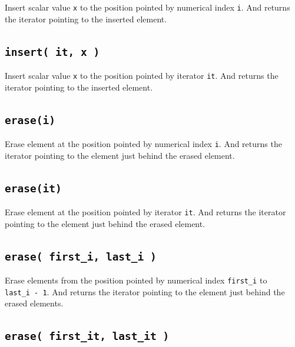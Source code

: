 \documentclass[
]{book}
\begin{document}
Insert scalar value \texttt{x} to the position pointed by numerical index \texttt{i}. And returns the iterator pointing to the inserted element.

\hypertarget{insert-it-x}{%
\subsection{\texorpdfstring{\texttt{insert(\ it,\ x\ )}}{insert( it, x )}}\label{insert-it-x}}

Insert scalar value \texttt{x} to the position pointed by iterator \texttt{it}. And returns the iterator pointing to the inserted element.

\hypertarget{erasei}{%
\subsection{\texorpdfstring{\texttt{erase(i)}}{erase(i)}}\label{erasei}}

Erase element at the position pointed by numerical index \texttt{i}. And returns the iterator pointing to the element just behind the erased element.

\hypertarget{eraseit}{%
\subsection{\texorpdfstring{\texttt{erase(it)}}{erase(it)}}\label{eraseit}}

Erase element at the position pointed by iterator \texttt{it}. And returns the iterator pointing to the element just behind the erased element.

\hypertarget{erase-first_i-last_i}{%
\subsection{\texorpdfstring{\texttt{erase(\ first\_i,\ last\_i\ )}}{erase( first\_i, last\_i )}}\label{erase-first_i-last_i}}

Erase elements from the position pointed by numerical index \texttt{first\_i} to \texttt{last\_i\ -\ 1}. And returns the iterator pointing to the element just behind the erased elements.

\hypertarget{erase-first_it-last_it}{%
\subsection{\texorpdfstring{\texttt{erase(\ first\_it,\ last\_it\ )}}{erase( first\_it, last\_it )}}\label{erase-first_it-last_it}}
\end{document}
